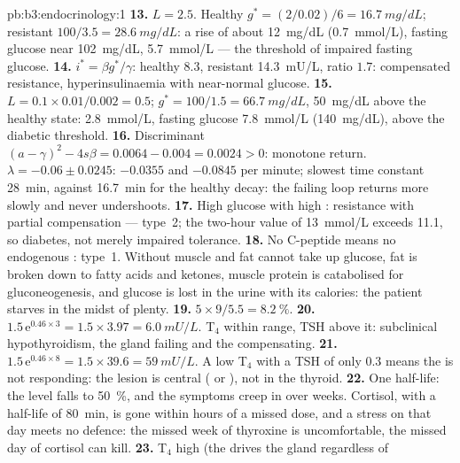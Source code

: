 \begin{solution}{pb:b3:endocrinology:1}
\textbf{13.} $L = 2.5$. Healthy $g^{*} = (2/0.02)/6 = \qty{16.7}{mg/dL}$;
resistant $100/3.5 = \qty{28.6}{mg/dL}$: a rise of about
\qty{12}{mg/dL} (\qty{0.7}{mmol/L}), fasting glucose near
\qty{102}{mg/dL}, \qty{5.7}{mmol/L} --- the threshold of impaired fasting
glucose.
\textbf{14.} $i^{*} = \beta g^{*}/\gamma$: healthy $8.3$, resistant
\qty{14.3}{mU/L}, ratio $1.7$: compensated  resistance,
hyperinsulinaemia with near-normal glucose.
\textbf{15.} $L = 0.1\times 0.01/0.002 = 0.5$; $g^{*} = 100/1.5 =
\qty{66.7}{mg/dL}$, \qty{50}{mg/dL} above the healthy state:
\qty{2.8}{mmol/L}, fasting glucose \qty{7.8}{mmol/L} (\qty{140}{mg/dL}),
above the diabetic threshold.
\textbf{16.} Discriminant $(a - \gamma)^{2} - 4s\beta = 0.0064 - 0.004 =
0.0024 > 0$: monotone return. $\lambda = -0.06 \pm 0.0245$: $-0.0355$
and $-0.0845$ per minute; slowest time constant \qty{28}{min}, against
\qty{16.7}{min} for the healthy decay: the failing loop returns more
slowly and never undershoots.
\textbf{17.} High glucose with high : resistance with partial
compensation --- type~2; the two-hour value of \qty{13}{mmol/L} exceeds
\qty{11.1}{}, so diabetes, not merely impaired tolerance.
\textbf{18.} No C-peptide means no endogenous : type~1. Without
 muscle and fat cannot take up glucose, fat is broken down to
fatty acids and ketones, muscle protein is catabolised for
gluconeogenesis, and glucose is lost in the urine with its calories:
the patient starves in the midst of plenty.
\textbf{19.} $5\times 9/5.5 = \qty{8.2}{\%}$.
\textbf{20.} $1.5\,\mathrm{e}^{0.46\times 3} = 1.5\times 3.97 =
\qty{6.0}{mU/L}$. T$_{4}$ within range, TSH above it: subclinical
hypothyroidism, the gland failing and the  compensating.
\textbf{21.} $1.5\,\mathrm{e}^{0.46\times 8} = 1.5\times 39.6 =
\qty{59}{mU/L}$. A low T$_{4}$ with a TSH of only $0.3$ means the
 is not responding: the lesion is central ( or
), not in the thyroid.
\textbf{22.} One half-life: the level falls to \qty{50}{\%}, and the
symptoms creep in over weeks. Cortisol, with a half-life of
\qty{80}{min}, is gone within hours of a missed dose, and a stress on
that day meets no defence: the missed week of thyroxine is
uncomfortable, the missed day of cortisol can kill.
\textbf{23.} T$_{4}$ high (the  drives the gland regardless of

\end{solution}
